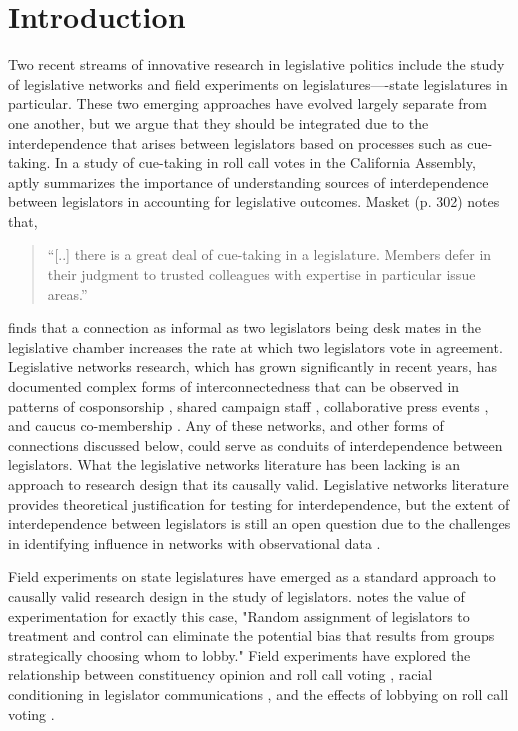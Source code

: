\documentclass[12pt]{article}
\begin{document}
\thispagestyle{empty}
\doublespacing



\section{Introduction}

Two recent streams of innovative research in legislative politics include the study of legislative networks and field experiments on legislatures----state legislatures in particular. These two emerging approaches have evolved largely separate from one another, but we argue that they should be integrated due to the interdependence that arises between legislators based on processes such as cue-taking.  In a study of cue-taking in roll call votes in the California Assembly, \citet{masket2008you} aptly summarizes the importance of understanding sources of interdependence between legislators in accounting for legislative outcomes. Masket (p. 302) notes that, 
\begin{quotation}
\noindent ``[..] there is a great deal of cue-taking in a legislature. Members defer in their judgment to trusted colleagues with expertise in particular issue areas.''
\end{quotation}
 \citet{masket2008you} finds that a connection as informal as two legislators being desk mates in the legislative chamber increases the rate at which two legislators vote in agreement. Legislative networks research, which has grown significantly in recent years, has documented complex forms of interconnectedness that can be observed in patterns of cosponsorship \citep{kirkland2013hypothesis,kirkland2011relational,fowler2006connecting}, shared campaign staff \citep{nyhan2015connecting}, collaborative press events \citep{desmarais2015measuring}, and caucus co-membership \citep{victor2009social}. Any of these networks, and other forms of connections discussed below, could serve as conduits of interdependence between legislators. What the legislative networks literature has been lacking is an approach to research design that its causally valid. Legislative networks literature provides theoretical justification for testing for interdependence, but the extent of interdependence between legislators is still an open question due to the challenges in identifying influence in networks with observational data \citep{Shalizi:2011}. 


Field experiments on state legislatures have emerged as a standard approach to causally valid research design in the study of legislators.  \citet[p. 331]{bergan2009does} notes the value of experimentation for exactly this case, "Random assignment of legislators to treatment and control can eliminate the potential bias that results from groups strategically choosing whom to lobby." Field experiments have explored the relationship between constituency opinion and roll call voting \citep{butler2011can}, racial conditioning in legislator communications \citep{broockman2013black}, and the effects of lobbying on roll call voting \citep{bergan2015call}. 
\end{document}
